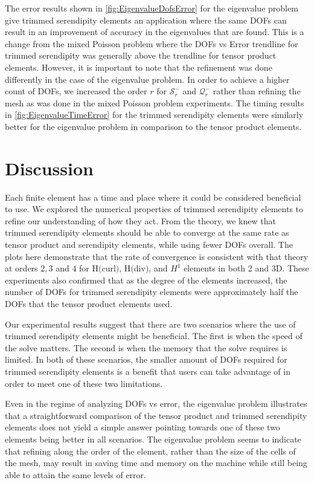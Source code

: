 \documentclass[manuscript,screen]{acmart}
\begin{document}
The error results shown in \ref{fig:EigenvalueDofsError} for the eigenvalue problem give trimmed serendipity elements an application where the same DOFs can result in an improvement of accuracy in the eigenvalues that are found.  This is a change from the mixed Poisson problem where the DOFs vs Error trendline for trimmed serendipity was generally above the trendline for tensor product elements.  However, it is important to note that the refinement was done differently in the case of the eigenvalue problem.  In order to achieve a higher count of DOFs, we increased the order $r$ for $\mathcal{S}^-_r$ and $\mathcal{Q}^-_r$ rather than refining the mesh as was done in the mixed Poisson problem experiments.  The timing results in \ref{fig:EigenvalueTimeError} for the trimmed serendipity elements were similarly better for the eigenvalue problem in comparison to the tensor product elements.


\section{Discussion}

Each finite element has a time and place where it could be considered beneficial to use.  We explored the numerical properties of trimmed serendipity elements to refine our understanding of how they act.  From the theory, we knew that trimmed serendipity elements should be able to converge at the same rate as tensor product and serendipity elements, while using fewer DOFs overall.  The plots here demonstrate that the rate of convergence is consistent with that theory at orders $2, 3$ and $4$ for H$($curl$)$, H$($div$)$, and $H^1$ elements in both 2 and 3D.  These experiments also confirmed that as the degree of the elements increased, the number of DOFs for trimmed serendipity elements were approximately half the DOFs that the tensor product elements used.

Our experimental results suggest that there are two scenarios where the use of trimmed serendipity elements might be beneficial.  The first is when the speed of the solve matters.  The second is when the memory that the solve requires is limited.  In both of these scenarios, the smaller amount of DOFs required for trimmed serendipity elements is a benefit that users can take advantage of in order to meet one of these two limitations.  

Even in the regime of analyzing DOFs vs error, the eigenvalue problem illustrates that a straightforward comparison of the tensor product and trimmed serendipity elements does not yield a simple answer pointing towards one of these two elements being better in all scenarios.  The eigenvalue problem seems to indicate that refining along the order of the element, rather than the size of the cells of the mesh, may result in saving time and memory on the machine while still being able to attain the same levels of error.
\end{document}
